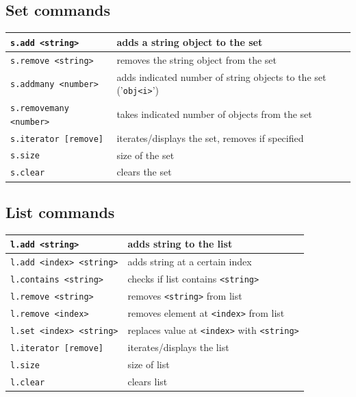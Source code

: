 \subsection*{Set commands}
\begin{tabular}{|p{4cm}|p{9cm}|}
    \hline
    \texttt{s.add <string>} & adds a string object to the set\\\hline
    \texttt{s.remove <string>} & removes the string object from the set\\\hline
    \texttt{s.addmany <number>} & adds indicated number of string objects to the set ('\texttt{obj<i>}')\\\hline
    \texttt{s.removemany <number>} & takes indicated number of objects from the set\\\hline
    \texttt{s.iterator [remove] } & iterates/displays the set, removes if specified\\\hline
    \texttt{s.size} & size of the set\\\hline
    \texttt{s.clear} & clears the set\\\hline
\end{tabular}
\subsection*{List commands}
\begin{tabular}{|p{4cm}|p{9cm}|}
    \hline
    \texttt{l.add <string>} & adds string to the list\\\hline
    \texttt{l.add <index> <string>} & adds string at a certain index\\\hline
    \texttt{l.contains <string>} & checks if list contains \texttt{<string>}\\\hline
    \texttt{l.remove <string>} & removes \texttt{<string>} from list\\\hline
    \texttt{l.remove <index>} & removes element at \texttt{<index>} from list\\\hline
    \texttt{l.set <index> <string>} & replaces value at \texttt{<index>} with \texttt{<string>}\\\hline
    \texttt{l.iterator [remove]} & iterates/displays the list\\\hline
    \texttt{l.size} & size of list\\\hline
    \texttt{l.clear} & clears list\\\hline
\end{tabular}
